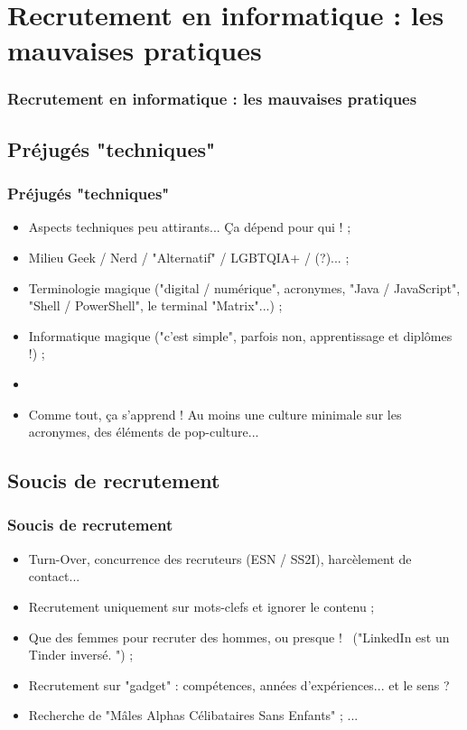 \documentclass[slidetop,11pt]{beamer}
\begin{document}

\section{Recrutement en informatique : les mauvaises pratiques}
\begin{frame}
	\frametitle{Recrutement en informatique : les mauvaises pratiques}
	\tableofcontents[sections=2,currentsection,subsectionstyle=show/shaded/hide] %
\end{frame}

\subsection{Pr{\'e}jug{\'e}s "techniques"}
\begin{frame}
	\frametitle{Pr{\'e}jug{\'e}s "techniques"}
	\begin{itemize}
		\item Aspects techniques peu attirants... \c{C}a d{\'e}pend pour qui ! ; 
		\item Milieu Geek / Nerd / "Alternatif" / LGBTQIA+ / (?)... ; %
		\item Terminologie magique ("digital / num{\'e}rique", acronymes, "Java / JavaScript", "Shell / PowerShell", le terminal "Matrix"...) ; 
		\item Informatique magique ("c'est simple", parfois non, apprentissage et dipl{\^o}mes !) ;  
		\item[] 
		\item Comme tout, \c{c}a s'apprend ! Au moins une culture minimale sur les acronymes, des {\'e}l{\'e}ments de pop-culture... 
	\end{itemize}
\end{frame}

\subsection{Soucis de recrutement}
\begin{frame}
	\frametitle{Soucis de recrutement}
	\begin{itemize}
		\item Turn-Over, concurrence des recruteurs (ESN / SS2I), harc{\`e}lement de contact... 
		\item Recrutement uniquement sur mots-clefs et ignorer le contenu ; 
		\item Que des femmes pour recruter des hommes, ou presque !~\newline
		("LinkedIn est un Tinder invers{\'e}. ") ; 
		\item Recrutement sur "gadget" : comp{\'e}tences, ann{\'e}es d'exp{\'e}riences... et le sens ?
		\item Recherche de "M{\^a}les Alphas C{\'e}libataires Sans Enfants" ; ...
	\end{itemize}
\end{frame}
\end{document}
